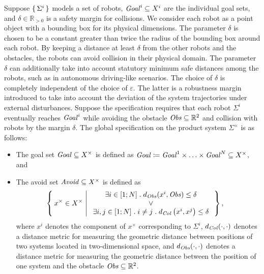 Suppose $\set{\Sigma^i}$ 
models a set of robots, 
$\mathit{Goal}^i\subseteq X^i$ are the individual goal sets, and $\delta \in \mathbb{R}_{>0}$ is a safety margin for collisions. 
We consider each robot as a point object with a bounding box for its physical dimensions. 
The parameter $\delta$ is chosen to be a constant greater than twice the radius of the bounding box around each robot. 
By keeping a distance at least $\delta$ from the other robots and the obstacles, the robots can avoid collision in their physical domain.
The parameter $\delta$ can additionally take into account statutory minimum safe distances among the robots, 
such as in autonomous driving-like scenarios.
The choice of $\delta$ is completely independent of the choice of $\varepsilon$. 
The latter is a robustness margin introduced to take into account the deviation of the system trajectories under external disturbances.
Suppose the specification requires that each robot $\Sigma^i$ eventually reaches $\mathit{Goal}^i$ 
while avoiding the obstacle $\mathit{Obs}\subseteq \mathbb{R}^2$ and collision with robots by the margin $\delta$.
The global specification on the product system $\Sigma^\times$ 
is as follows:
\begin{itemize}
	\item The goal set $\mathit{Goal}\subseteq X^\times$ is defined as $\mathit{Goal} \coloneqq \mathit{Goal}^1\times \ldots \times \mathit{Goal}^N \subseteq X^\times$, and
	\item The avoid set $\mathit{Avoid}\subseteq X^\times$ is defined as 
		\begin{align}
				&\Set{ x^\times\in X^\times | 
					\begin{array}{c}
						\exists i\in [1;N]\;.\; d_{\mathit{Obs}}(x^i,\mathit{Obs}) \leq \delta\\
						\vee\\
						 \exists i,j\in [1;N]\;.\;i\neq j\;.\;d_{\mathit{Col}}\left(x^i,x^j\right)\leq\delta
					\end{array}},
		\end{align}
	where $x^i$ denotes the component of $x^\times$ corresponding to $\Sigma^i$, $d_{\mathit{Col}}(\cdot,\cdot)$ denotes a 
distance metric for measuring the geometric distance between positions of two systems located in two-dimensional space, 
and $d_{\mathit{Obs}}(\cdot,\cdot)$ denotes a distance metric for measuring the geometric distance between the 
position of one system and the obstacle $\mathit{Obs}\subseteq \mathbb{R}^2$.
\end{itemize}
%

